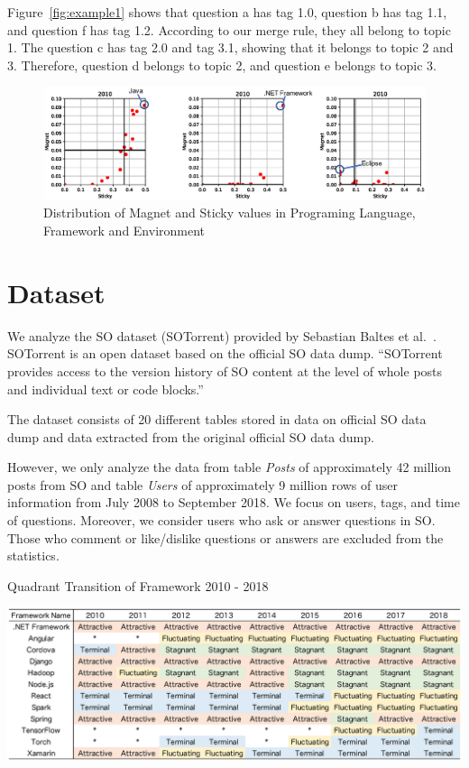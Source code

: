 \documentclass[english,preprint,JIP,technote]{ipsj}
\begin{document}
Figure~\ref{fig:example1} shows that question a has tag 1.0, question b has tag 1.1, and question f has tag 1.2. According to our merge rule, they all belong to topic 1. The question c has tag 2.0 and tag 3.1, showing that it belongs to topic 2 and 3. Therefore, question d belongs to topic 2, and question e belongs to topic 3.


\begin{figure}[t]
 \centering
 \includegraphics[width=1.0\hsize]{img/2010all.eps}  
 \caption{Distribution of Magnet and Sticky values in Programing Language, Framework and Environment} 
 \label{fig:2010} 
\end{figure}


\section{Dataset}
We analyze the SO dataset (SOTorrent) provided by Sebastian Baltes et al.~\cite{msr2019challenge}. SOTorrent is an open dataset based on the official SO data dump. ``SOTorrent provides access to the version history of SO content at the level of whole posts and individual text or code blocks.''

The dataset consists of 20 different tables stored in data on official SO data dump and data extracted from the original official SO data dump.

However, we only analyze the data from table \emph{Posts} of approximately 42 million posts from SO and table \emph{Users} of approximately 9 million rows of user information from July 2008 to September 2018. We focus on  users, tags, and time of questions. Moreover, we consider users who ask or answer questions in SO. Those who comment or like/dislike questions or answers are excluded from the statistics.



\begin{table}[t]
 \centering
 \caption{Quadrant Transition of Framework 2010 - 2018} 
 \includegraphics[width=1.0\hsize]{img/frame2010-2018.eps} 
 \label{table1} 
\end{table}
\end{document}
